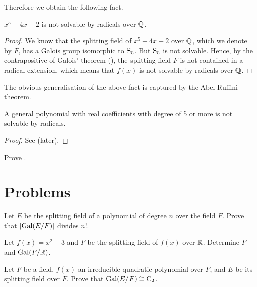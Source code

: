 Therefore we obtain the following fact.

\begin{proposition}
    $x^5 - 4x - 2$ is not solvable by radicals over $\mathbb{Q}$.
\end{proposition}
\begin{proof}
    We know that the splitting field of $x^5 - 4x - 2$ over $\mathbb{Q}$, which we denote by $F$, has a Galois group isomorphic to $\mathrm{S}_{5}$. But $\mathrm{S}_{5}$ is not solvable. Hence, by the contrapositive of Galois' theorem (), the splitting field $F$ is not contained in a radical extension, which means that $f(x)$ is not solvable by radicals over $\mathbb{Q}$.
\end{proof}

The obvious generalisation of the above fact is captured by the Abel-Ruffini theorem.

\begin{theorem}\label{thrm-abel-ruffini}
    A general polynomial with real coefficients with degree of 5 or more is not solvable by radicals.
\end{theorem}
\begin{proof}
    See  (later).
\end{proof}

\begin{exercise}\label{exercise-prove-abel-ruffini}
    Prove .
\end{exercise}



\section{Problems}
\begin{problem}
    Let $E$ be the splitting field of a polynomial of degree $n$ over the field $F$. Prove that $|\mathrm{Gal}(E/F)|$ divides $n!$.
\end{problem}

\begin{problem}
    Let $f(x) = x^2 + 3$ and $F$ be the splitting field of $f(x)$ over $\mathbb{R}$. Determine $F$ and $\mathrm{Gal}(F/\mathbb{R})$.
\end{problem}

\begin{problem}
    Let $F$ be a field, $f(x)$ an irreducible quadratic polynomial over $F$, and $E$ be its splitting field over $F$. Prove that $\mathrm{Gal}(E/F) \cong \mathrm{C}_{2}$.
\end{problem}

